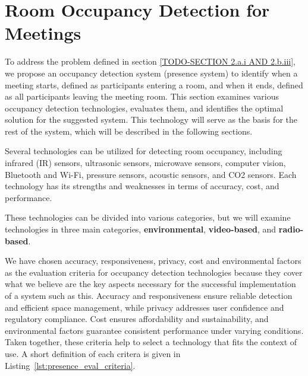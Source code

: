 \chapter{\label{sec:presence_intro}Room Occupancy Detection for Meetings}

To address the problem defined in section \ref{TODO-SECTION 2.a.i AND 2.b.iii}, we propose an occupancy detection system (presence system) to identify when a meeting starts, defined as participants entering a room, and when it ends, defined as all participants leaving the meeting room.
This section examines various occupancy detection technologies, evaluates them, and identifies the optimal solution for the suggested system.
This technology will serve as the basis for the rest of the system, which will be described in the following sections.

Several technologies can be utilized for detecting room occupancy, including infrared (IR) sensors\cite{woodward-2021}\cite{dodierBuildingOccupancyDetection2006}\cite{OccupancySensorMotion}, ultrasonic sensors\cite{woodward-2021}\cite{dodierBuildingOccupancyDetection2006}\cite{OccupancySensorMotion}, microwave sensors\cite{woodward-2021}, computer vision\cite{co2sensor}\cite{longoAccurateOccupancyEstimation2019}\cite{OccupancySensorMotion}, Bluetooth and Wi-Fi\cite{teissedre-2019,longoAccurateOccupancyEstimation2019}, pressure sensors\cite{OccupancySensorMotion}, acoustic sensors\cite{OccupancySensorMotion}, and CO2 sensors\cite{co2sensor}\cite{longoAccurateOccupancyEstimation2019}\cite{jinSensingProxyOccupancy2015}.\cite{faragherLocationFingerprintingBluetooth2015}
Each technology has its strengths and weaknesses in terms of accuracy, cost, and performance.

These technologies can be divided into various categories, but we will examine technologies in three main categories, \textbf{environmental}, \textbf{video-based}, and \textbf{radio-based}.

We have chosen accuracy, responsiveness, privacy, cost and environmental factors as the evaluation criteria for occupancy detection technologies because they cover what we believe are the key aspects necessary for the successful implementation of a system such as this.
Accuracy and responsiveness ensure reliable detection and efficient space management, while privacy addresses user confidence and regulatory compliance.
Cost ensures affordability and sustainability, and environmental factors guarantee consistent performance under varying conditions.
Taken together, these criteria help to select a technology that fits the context of use.
A short definition of each critera is given in Listing~\ref{lst:presence_eval_criteria}.


